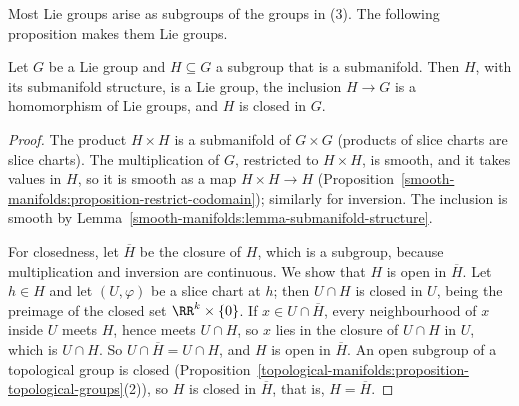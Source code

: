 Most Lie groups arise as subgroups of the groups in (3). The following proposition makes them Lie groups.

\begin{proposition}\label{lie-groups:proposition-lie-subgroup}
Let $G$ be a Lie group and $H \subseteq G$ a subgroup that is a submanifold. Then $H$, with its submanifold structure, is a Lie group, the inclusion
$H \to G$ is a homomorphism of Lie groups, and $H$ is closed in $G$.
\end{proposition}

\begin{proof}
The product $H \times H$ is a submanifold of $G \times G$ (products of slice charts are slice charts). The multiplication of $G$, restricted to
$H \times H$, is smooth, and it takes values in $H$, so it is smooth as a map $H \times H \to H$ (Proposition~\ref{smooth-manifolds:proposition-restrict-codomain});
similarly for inversion. The inclusion is smooth by Lemma~\ref{smooth-manifolds:lemma-submanifold-structure}.

For closedness, let $\overline{H}$ be the closure of $H$, which is a subgroup, because multiplication and inversion are continuous. We show that $H$ is open in
$\overline{H}$. Let $h \in H$ and let $(U, \varphi)$ be a slice chart at $h$; then $U \cap H$ is closed in $U$, being the preimage of the closed set
$\RR^k \times \{0\}$. If $x \in U \cap \overline{H}$, every neighbourhood of $x$ inside $U$ meets $H$, hence meets $U \cap H$, so $x$ lies in the closure of
$U \cap H$ in $U$, which is $U \cap H$. So $U \cap \overline{H} = U \cap H$, and $H$ is open in $\overline{H}$. An open subgroup of a topological group is closed
(Proposition~\ref{topological-manifolds:proposition-topological-groups}(2)), so $H$ is closed in $\overline{H}$, that is, $H = \overline{H}$.
\end{proof}

